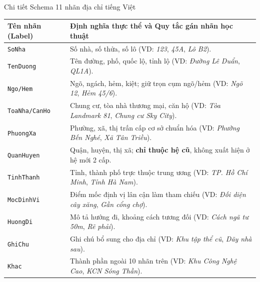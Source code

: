 \documentclass[aspectratio=169, 9pt]{beamer}
\begin{document}
\begin{frame}{Chi tiết Schema 11 nhãn địa chỉ tiếng Việt}
  \vspace{-0.2cm}
  {\fontsize{7.2pt}{9pt}\selectfont
  \begin{tabularx}{\textwidth}{l X}
    \toprule
    \rowcolor{tableheader}
    \textbf{Tên nhãn (Label)} & \textbf{Định nghĩa thực thể và Quy tắc gán nhãn học thuật} \\
    \midrule
    \texttt{SoNha} & Số nhà, số thửa, số lô (VD: \textit{123}, \textit{45A}, \textit{Lô B2}). \\
    \addlinespace[0.6pt]
    \texttt{TenDuong} & Tên đường, phố, quốc lộ, tỉnh lộ (VD: \textit{Đường Lê Duẩn}, \textit{QL1A}). \\
    \addlinespace[0.6pt]
    \texttt{Ngo/Hem} & Ngõ, ngách, hẻm, kiệt; giữ trọn cụm ngõ/hẻm (VD: \textit{Ngõ 12}, \textit{Hẻm 45/6}). \\
    \addlinespace[0.6pt]
    \texttt{ToaNha/CanHo} & Chung cư, tòa nhà thương mại, căn hộ (VD: \textit{Tòa Landmark 81}, \textit{Chung cư Sky City}). \\
    \addlinespace[0.6pt]
    \texttt{PhuongXa} & Phường, xã, thị trấn cấp cơ sở chuẩn hóa (VD: \textit{Phường Bến Nghé}, \textit{Xã Tân Triều}). \\
    \addlinespace[0.6pt]
    \texttt{QuanHuyen} & Quận, huyện, thị xã; \textbf{chỉ thuộc hệ cũ}, không xuất hiện ở hệ mới 2 cấp. \\
    \addlinespace[0.6pt]
    \texttt{TinhThanh} & Tỉnh, thành phố trực thuộc trung ương (VD: \textit{TP. Hồ Chí Minh}, \textit{Tỉnh Hà Nam}). \\
    \addlinespace[0.6pt]
    \texttt{MocDinhVi} & Điểm mốc định vị lân cận làm tham chiếu (VD: \textit{Đối diện cây xăng}, \textit{Gần cổng chợ}). \\
    \addlinespace[0.6pt]
    \texttt{HuongDi} & Mô tả hướng đi, khoảng cách tương đối (VD: \textit{Cách ngã tư 50m}, \textit{Rẽ phải}). \\
    \addlinespace[0.6pt]
    \texttt{GhiChu} & Ghi chú bổ sung cho địa chỉ (VD: \textit{Khu tập thể cũ}, \textit{Dãy nhà sau}). \\
    \addlinespace[0.6pt]
    \texttt{Khac} & Thành phần ngoài 10 nhãn trên (VD: \textit{Khu Công Nghệ Cao}, \textit{KCN Sóng Thần}). \\
    \bottomrule
  \end{tabularx}
  }
\end{frame}
\end{document}
